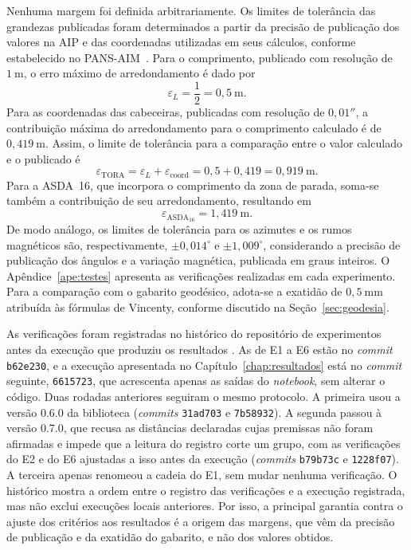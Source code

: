 
Nenhuma margem foi definida arbitrariamente. Os limites de tolerância das
grandezas publicadas foram determinados a partir da precisão de publicação
dos valores na AIP e das coordenadas utilizadas em seus cálculos, conforme
estabelecido no PANS-AIM~\cite{icao2018pansaim}. Para o comprimento, publicado
com resolução de $1~\mathrm{m}$, o erro máximo de arredondamento é dado por
\[
\varepsilon_L = \frac{1}{2} = 0{,}5~\mathrm{m}.
\]
Para as coordenadas das cabeceiras, publicadas com resolução de
$0{,}01''$, a contribuição máxima do arredondamento para o comprimento
calculado é de $0{,}419~\mathrm{m}$. Assim, o limite de tolerância para a
comparação entre o valor calculado e o publicado é
\[
\varepsilon_{\mathrm{TORA}} =
\varepsilon_L + \varepsilon_{\mathrm{coord}}
= 0{,}5 + 0{,}419
= 0{,}919~\mathrm{m}.
\]
Para a ASDA~16, que incorpora o comprimento da zona de parada, soma-se
também a contribuição de seu arredondamento, resultando em
\[
\varepsilon_{\mathrm{ASDA}_{16}} = 1{,}419~\mathrm{m}.
\]
De modo análogo, os limites de tolerância para os azimutes e os rumos
magnéticos são, respectivamente, $\pm 0{,}014^\circ$ e
$\pm 1{,}009^\circ$, considerando a precisão de publicação dos ângulos
e a variação magnética, publicada em graus inteiros. O Apêndice~\ref{ape:testes}
apresenta as verificações realizadas em cada experimento. Para a comparação
com o gabarito geodésico, adota-se a exatidão de $0{,}5~\mathrm{mm}$
atribuída às fórmulas de Vincenty, conforme discutido na
Seção~\ref{sec:geodesia}.

As verificações foram registradas no histórico do repositório de experimentos antes da execução que produziu os resultados \cite{aeroledger_experimentos}. As de E1 a E6 estão no \textit{commit} \texttt{b62e230}, e a execução apresentada no Capítulo~\ref{chap:resultados} está no \textit{commit} seguinte, \texttt{6615723}, que acrescenta apenas as saídas do \textit{notebook}, sem alterar o código. Duas rodadas anteriores seguiram o mesmo protocolo. A primeira usou a versão 0.6.0 da biblioteca (\textit{commits} \texttt{31ad703} e \texttt{7b58932}). A segunda passou à versão 0.7.0, que recusa as distâncias declaradas cujas premissas não foram afirmadas e impede que a leitura do registro corte um grupo, com as verificações do E2 e do E6 ajustadas a isso antes da execução (\textit{commits} \texttt{b79b73c} e \texttt{1228f07}). A terceira apenas renomeou a cadeia do E1, sem mudar nenhuma verificação. O histórico mostra a ordem entre o registro das verificações e a execução registrada, mas não exclui execuções locais anteriores. Por isso, a principal garantia contra o ajuste dos critérios aos resultados é a origem das margens, que vêm da precisão de publicação e da exatidão do gabarito, e não dos valores obtidos.

